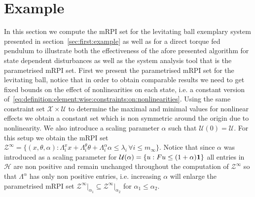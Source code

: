 \documentclass[letterpaper, 10pt, conference]{ieeeconf} %
\begin{document}
\section{Example}\label{sec:second:example}
%
%
In this section we compute the mRPI set for the levitating ball exemplary system presented in 
section~\ref{sec:first:example} as well as for a direct torque fed pendulum to illustrate both
the effectiveness of the afore presented algorithm for state dependent disturbances as well as
the system analysis tool that is the parametrised mRPI set. First we present the parametrised mRPI
set for the levitating ball, notice that in order to obtain comparable results we need to get fixed bounds
on the effect of nonlinearities on each state, i.e. a constant version 
of~\eqref{eq:definition:element:wise:constraints:on:nonlinearities}. Using the same constraint set 
$\mathcal X \times \mathcal U$ to determine the maximal and minimal values for nonlinear effects
we obtain a constant set which is non symmetric around the origin due to nonlinearity. We also introduce
a scaling parameter $\alpha$ such that $\mathcal U(0)=\mathcal U$. For this setup we obtain the mRPI
set $\mathcal Z^\infty=\{(x,\theta,\alpha): \Lambda_i^x x + \Lambda_i^\theta \theta + \Lambda_i^\alpha \alpha\leq
\lambda_i\,\forall i\leq m_\infty\}$. Notice that since $\alpha$ was introduced as a scaling parameter
for $\mathcal U(\alpha)=\{u: Fu\leq (1+\alpha){\bf{1}}\}$ all entries in $\mathcal H$ are non positive and
remain unchanged throughout the computation of $\mathcal Z^\infty$ so that $\Lambda^\alpha$ has only non
positive entries, i.e. increasing $\alpha$ will enlarge the parametrised mRPI set $\mathcal Z^\infty\vert_{\alpha_1}
\subseteq\mathcal Z^\infty\vert_{\alpha_2}$ for $\alpha_1\leq\alpha_2$.
\end{document}
